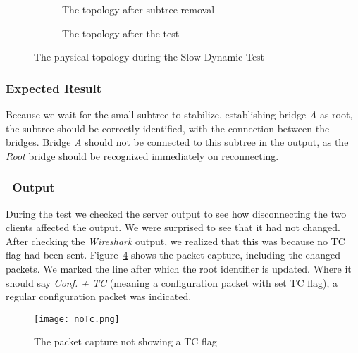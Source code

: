 \begin{figure}[h]
\begin{center}
\begin{subfigure}[b]{0.4\textwidth}
            \caption{The topology after subtree removal}
            \label{fig:sdcTest3}
        \end{subfigure}
        \hspace{1cm}
        \begin{subfigure}[b]{0.4\textwidth}
            \caption{The topology after the test}
            \label{fig:sdcTest5}
       \end{subfigure}
    \end{center}
    \caption{The physical topology during the Slow Dynamic Test}
    \label{fig:sdcTest}
\end{figure}

\subsubsection*{Expected Result}
Because we wait for the small subtree to stabilize, establishing bridge \textit{A} as root, the subtree should be correctly identified, with the connection between the bridges.
Bridge \textit{A} should not be connected to this subtree in the output, as the \textit{Root} bridge should be recognized immediately on reconnecting.

\subsubsection*{\tool\ Output}
During the test we checked the server output to see how disconnecting the two clients affected the output.
We were surprised to see that it had not changed.
After checking the \textit{Wireshark} output, we realized that this was because no TC flag had been sent.
Figure~\ref{fig:noTc} shows the packet capture, including the changed packets.
We marked the line after which the root identifier is updated.
Where it should say \textit{Conf. + TC} (meaning a configuration packet with set TC flag), a regular configuration packet was indicated.
\begin{figure}[h]
    \centering
    \texttt{[image: noTc.png]}
    \caption{The packet capture not showing a TC flag}
    \label{fig:noTc}
\end{figure}

